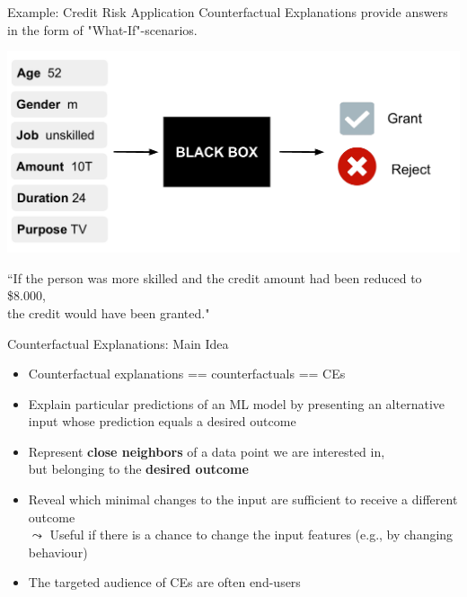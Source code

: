 \documentclass[11pt,compress,t,notes=noshow, aspectratio=169, xcolor=table, usenames,dvipsnames]{beamer}
\begin{document}
\begin{frame}[c]{Example: Credit Risk Application}
	Counterfactual Explanations provide answers in the form of "What-If"-scenarios.
	\begin{center}\includegraphics[width=0.6\linewidth, page=2]{figure/counterfactuals_credit.pdf} \end{center}

	``If the person was more skilled and the credit amount had been reduced to \$8.000,\\ the credit would have been granted."  \\[0.2cm]

\end{frame}


\begin{frame}[c]{Counterfactual Explanations: Main Idea}
	\begin{itemize}[<+->]
	    \item Counterfactual explanations == counterfactuals == CEs
	    \item Explain particular predictions of an ML model by presenting an alternative input whose prediction equals a desired outcome
		\item Represent \textbf{close neighbors} of a data point we are interested in,\\ but belonging to the \textbf{desired outcome}
		\item Reveal which minimal changes to the input are sufficient to receive a different outcome\\
		$\leadsto$ Useful if there is a chance to change the input features (e.g., by changing behaviour)
		\item The targeted audience of CEs are often end-users%
	\end{itemize}
\end{frame}
\end{document}
